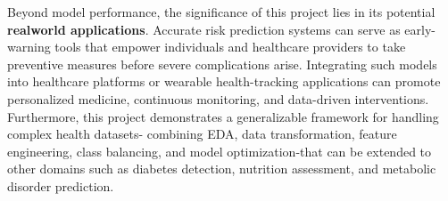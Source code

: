 Beyond model performance, the significance of this project lies in its potential \textbf{realworld applications}.
Accurate risk prediction systems can serve as early-warning tools that empower individuals and healthcare providers to take preventive measures before severe complications arise.
Integrating such models into healthcare platforms or wearable health-tracking applications can promote personalized medicine, continuous monitoring, and data-driven interventions.
Furthermore, this project demonstrates a generalizable framework for handling complex health datasets- combining EDA, data transformation, feature engineering, class balancing, and model optimization-that can be extended to other domains such as diabetes detection, nutrition assessment, and metabolic disorder prediction.
